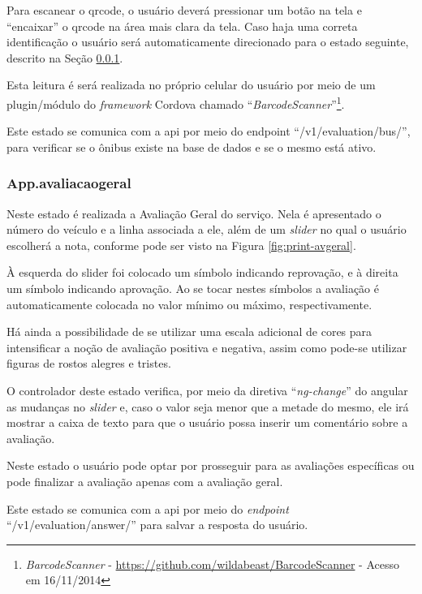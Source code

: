 Para escanear o \gls{qrcode}, o usuário deverá pressionar um botão na tela e ``encaixar'' o \gls{qrcode} na área mais clara da tela. Caso haja uma correta identificação o usuário será automaticamente direcionado para o estado seguinte, descrito na Seção \ref{subsubsec:app-aval-geral}.

Esta leitura é será realizada no próprio celular do usuário por meio de um plugin/módulo do \textit{framework} Cordova chamado ``\textit{BarcodeScanner}''\footnote{\textit{BarcodeScanner} - \url{https://github.com/wildabeast/BarcodeScanner} - Acesso em 16/11/2014}.

Este estado se comunica com a \gls{api} por meio do endpoint ``/v1/evaluation/bus/'', para verificar se o ônibus existe na base de dados e se o mesmo está ativo.

\subsubsection{App.avaliacaogeral}\label{subsubsec:app-aval-geral}
Neste estado é realizada a Avaliação Geral do serviço. Nela é apresentado o número do veículo e a linha associada a ele, além de um \textit{slider} no qual o usuário escolherá a nota, conforme pode ser visto na Figura \ref{fig:print-avgeral}.


À esquerda do slider foi colocado um símbolo indicando reprovação, e à direita um símbolo indicando aprovação. Ao se tocar nestes símbolos a avaliação é automaticamente colocada no valor mínimo ou máximo, respectivamente.

Há ainda a possibilidade de se utilizar uma escala adicional de cores para intensificar a noção de avaliação positiva e negativa, assim como pode-se utilizar figuras de rostos alegres e tristes.

O controlador deste estado verifica, por meio da diretiva ``\textit{ng-change}'' do \gls{angular} as mudanças no \textit{slider} e, caso o valor seja menor que a metade do mesmo, ele irá mostrar a caixa de texto para que o usuário possa inserir um comentário sobre a avaliação.

Neste estado o usuário pode optar por prosseguir para as avaliações específicas ou pode finalizar a avaliação apenas com a avaliação geral.

Este estado se comunica com a \gls{api} por meio do \textit{endpoint} ``/v1/evaluation/answer/'' para salvar a resposta do usuário.

